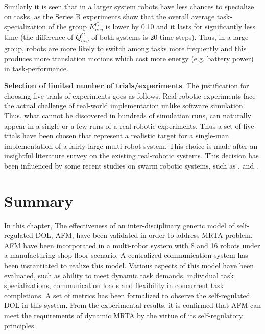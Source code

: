Similarly it is seen that in a larger system robots have less chances to specialize on tasks, as the Series B experiments show  that the overall average task-specialization of the group $K^G_{avg}$ is lower by 0.10 and it lasts for significantly less time (the difference of $Q^G_{avg}$  of both systems is 20 time-steps). Thus, in a large group, robots are more likely to switch among tasks more frequently and this produces more translation motions which cost more energy (e.g. battery power) in task-performance.

\textbf{Selection of limited number of trials/experiments}. The justification for choosing five trials of experiments goes as follows.  Real-robotic experiments face the actual challenge of real-world implementation unlike software simulation. Thus, what cannot be discovered in hundreds of simulation runs, can naturally appear in a single or a few runs of a real-robotic experiments. Thus a set of five trials have been chosen that represent a realistic target for a single-man implementation of a fairly large multi-robot system. This choice is made after an insightful literature survey on the existing real-robotic systems. This decision has been influenced by some recent studies on swarm robotic systems, such as ,  and . 
\vspace*{1cm}
\section{Summary}
\label{afm:summary}
In this chapter,  The effectiveness of an inter-disciplinary generic model of self-regulated DOL, AFM, have been validated in order to address MRTA problem. AFM have been incorporated  in a multi-robot system with 8 and 16 robots under a manufacturing shop-floor scenario. A centralized communication system has been instantiated to realize this model.  Various aspects of this model have been evaluated, such as ability to meet dynamic task demands, individual task specializations, communication loads and flexibility in concurrent task completions. A set of metrics has been formalized to observe the self-regulated DOL in this system. From the experimental results,  it is confirmed that AFM can meet the requirements of dynamic MRTA by the virtue of its self-regulatory principles.